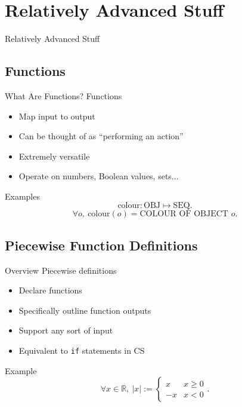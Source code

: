 \documentclass{beamer}
\begin{document}
	\section{Relatively Advanced Stuff}
		\begin{frame}
			\begin{center}
				Relatively Advanced Stuff
			\end{center}
		\end{frame}
		\subsection{Functions}
			\begin{frame}{What Are Functions?}
				Functions
				\begin{itemize}
					\item Map input to output
					\item Can be thought of as ``performing an action''
					\item Extremely versatile
					\item Operate on numbers, Boolean values, sets...
				\end{itemize}
			\end{frame}
			\begin{frame}{Examples}
				\[
					\textrm{colour} : \textrm{OBJ} \mapsto \textrm{SEQ}.
				\]
				\[
					\forall o, \ \textrm{colour}\left(o\right) = \textrm{COLOUR OF OBJECT $o$}.
				\]
			\end{frame}
		\subsection{Piecewise Function Definitions}
			\begin{frame}{Overview}
				Piecewise definitions
				\begin{itemize}
					\item Declare functions
					\item Specifically outline function outputs
					\item Support any sort of input
					\item Equivalent to \texttt{if} statements in CS
				\end{itemize}
			\end{frame}
			\begin{frame}{Example}
				\[
					\forall x \in \mathbb{R}, \ 
					\left|x\right| :=
					\left\{
						\begin{array}{rl}
							x	&	x \geq 0\\
							-x & x < 0
						\end{array}
					\right..
				\]
			\end{frame}
\end{document}
